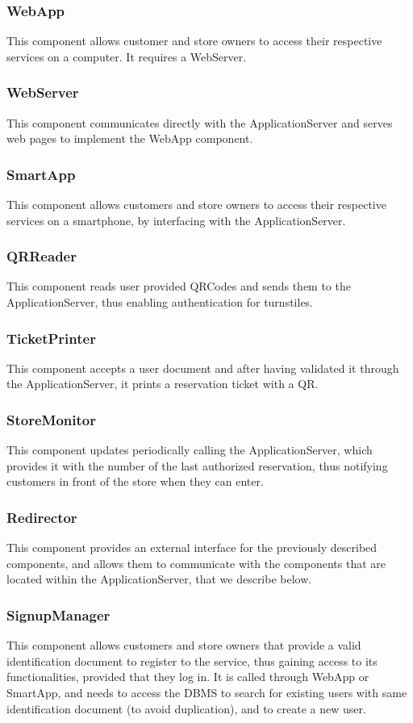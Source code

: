 \subsubsection{WebApp}
This component allows customer and store owners to access their respective services on a computer. It requires a WebServer.
\subsubsection{WebServer}
This component communicates directly with the ApplicationServer and serves web pages to implement the WebApp component.
\subsubsection{SmartApp}
This component allows customers and store owners to access their respective services on a smartphone, by interfacing with the ApplicationServer.
\subsubsection{QRReader}
This component reads user provided QRCodes and sends them to the ApplicationServer, thus enabling authentication for turnstiles.
\subsubsection{TicketPrinter}
This component accepts a user document and after having validated it through the ApplicationServer, it prints a reservation ticket with a QR.
\subsubsection{StoreMonitor}
This component updates periodically calling the ApplicationServer, which provides it with the number of the last authorized reservation, thus notifying customers in front of the store when they can enter.
\subsubsection{Redirector}
This component provides an external interface for the previously described components, and allows them to communicate with the components that are located within the ApplicationServer, that we describe below.
\subsubsection{SignupManager}
This component allows customers and store owners that provide a valid identification document to register to the service, thus gaining access to its functionalities, provided that they log in. It is called through WebApp or SmartApp, and needs to access the DBMS to search for existing users with same identification document (to avoid duplication), and to create a new user.
